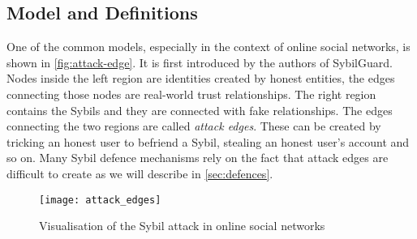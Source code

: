 
\subsection{Model and Definitions}
One of the common models, especially in the context of online social networks,
is shown in \autoref{fig:attack-edge}. It is first introduced by the authors of
SybilGuard\cite{yu2006sybilguard}. Nodes inside the left region are identities
created by honest entities, the edges connecting those nodes are real-world
trust relationships. The right region contains the Sybils and they are connected
with fake relationships. The edges connecting the two regions are called
\emph{attack edges}. These can be created by tricking an honest user to befriend
a Sybil, stealing an honest user's account and so on. Many Sybil defence
mechanisms rely on the fact that attack edges are difficult to create as we will
describe in \autoref{sec:defences}.

\begin{figure}
  \centering
  \texttt{[image: attack\_edges]}
  \caption{Visualisation of the Sybil attack in online social networks}
  \label{fig:attack-edge}
\end{figure}



